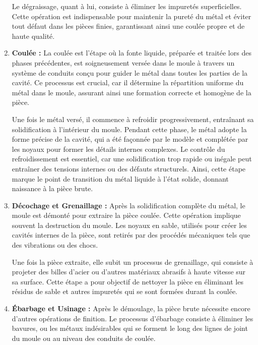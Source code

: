 \documentclass[12pt]{article}
\begin{document}
\begin{enumerate}
    Le dégraissage, quant à lui, consiste à éliminer les impuretés 
    superficielles. Cette opération est indispensable pour maintenir la 
    pureté du métal et éviter tout défaut dans les pièces finies, 
    garantissant ainsi une coulée propre et de haute qualité.

    
    \item \textbf{ Coulée :} La coulée est l'étape où la fonte liquide, 
    préparée et traitée lors des phases précédentes, est soigneusement 
    versée dans le moule à travers un système de conduits conçu pour 
    guider le métal dans toutes les parties de la cavité. Ce processus est
    crucial, car il détermine la répartition uniforme du métal dans le 
    moule, assurant ainsi une formation correcte et homogène de la pièce.

    Une fois le métal versé, il commence à refroidir progressivement, 
    entraînant sa solidification à l'intérieur du moule. Pendant cette 
    phase, le métal adopte la forme précise de la cavité, qui a été 
    façonnée par le modèle et complétée par les noyaux pour former les 
    détails internes complexes. Le contrôle du refroidissement est 
    essentiel, car une solidification trop rapide ou inégale peut 
    entraîner des tensions internes ou des défauts structurels. 
    Ainsi, cette étape marque le point de transition du métal liquide à 
    l'état solide, donnant naissance à la pièce brute.
    
    

    \item \textbf{Décochage et Grenaillage :} Après la solidification 
    complète du métal, le moule est démonté pour extraire la pièce coulée. 
    Cette opération implique souvent la destruction du moule. Les noyaux 
    en sable, utilisés pour créer les cavités internes de la pièce, sont 
    retirés par des procédés mécaniques tels que des vibrations ou des chocs.

    Une fois la pièce extraite, elle subit un processus de grenaillage, 
    qui consiste à projeter des billes d'acier ou d'autres matériaux 
    abrasifs à haute vitesse sur sa surface. Cette étape a pour objectif 
    de nettoyer la pièce en éliminant les résidus de sable et autres 
    impuretés qui se sont formées durant la coulée. 
    
    \item \textbf{Ébarbage et Usinage :} Après le démoulage, la pièce 
    brute nécessite encore d'autres opérations de finition. Le processus 
    d'ébarbage consiste à éliminer les bavures, ou les métaux 
    indésirables qui se forment le long des lignes de joint du moule ou 
    au niveau des conduits de coulée. 


\end{enumerate}
\end{document}
